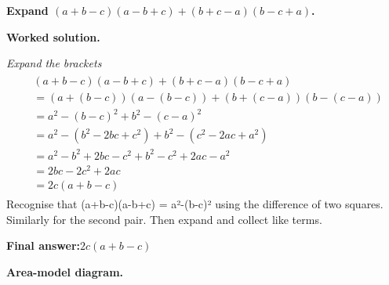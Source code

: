 \documentclass[11pt]{article}
\newcommand{\question}[1]{\par\medskip\noindent\textbf{#1}\par}
\begin{document}
\question{Expand \(  (a+b-c)(a-b+c) + (b+c-a)(b-c+a) \).}

\textbf{Worked solution.}

\textit{Expand the brackets}
\[\begin{gathered}
\begin{aligned} &(a+b-c)(a-b+c)+(b+c-a)(b-c+a) \\ &= (a+(b-c))(a-(b-c))+(b+(c-a))(b-(c-a)) \\ &= a^2-(b-c)^2+b^2-(c-a)^2 \\ &= a^2-(b^2-2bc+c^2)+b^2-(c^2-2ac+a^2) \\ &= a^2-b^2+2bc-c^2+b^2-c^2+2ac-a^2 \\ &= 2bc-2c^2+2ac \\ &= 2c(a+b-c) \end{aligned}
\end{gathered}\]
Recognise that (a+b-c)(a-b+c) = a²-(b-c)² using the difference of two squares. Similarly for the second pair. Then expand and collect like terms.

\begin{answerbox}
\textbf{Final answer:}\quad \(\displaystyle 2c(a+b-c)\)
\end{answerbox}
\textbf{Area-model diagram.}
\end{document}
